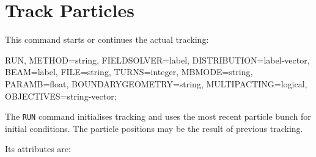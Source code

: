 \section{Track Particles}
\label{sec:trackrun}

This command starts or continues the actual tracking:
\begin{example}
RUN, METHOD=string, FIELDSOLVER=label, DISTRIBUTION=label-vector, BEAM=label,
FILE=string, TURNS=integer, MBMODE=string, PARAMB=float,
BOUNDARYGEOMETRY=string, MULTIPACTING=logical, OBJECTIVES=string-vector;
\end{example}
The \texttt{RUN} command initialises tracking and uses the most recent
particle bunch for initial conditions.
The particle positions may be the result of previous tracking.

Its attributes are:
